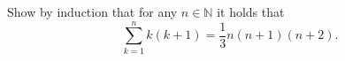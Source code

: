 Show by induction that for any $n \in \mathbb{N}$ it holds that
$$
	\sum_{k=1}^n k(k+1) = \frac{1}{3}n (n+1) (n+2).
$$